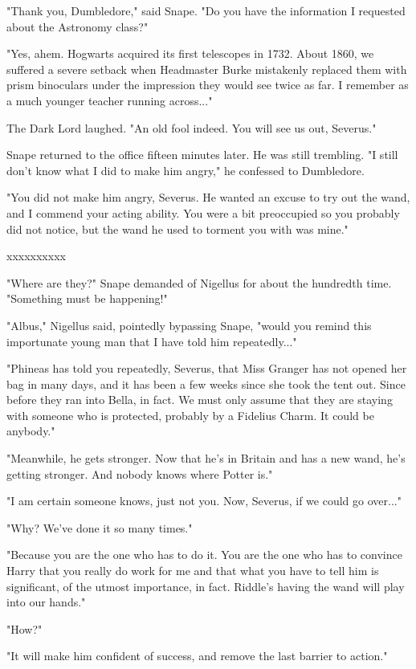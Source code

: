 \documentclass[a4paper,11pt]{article}
\begin{document}
"Thank you, Dumbledore," said Snape. "Do you have the information I requested about the Astronomy class?"

"Yes, ahem. Hogwarts acquired its first telescopes in 1732. About 1860, we suffered a severe setback when Headmaster Burke mistakenly replaced them with prism binoculars under the impression they would see twice as far. I remember as a much younger teacher running across..."

The Dark Lord laughed. "An old fool indeed. You will see us out, Severus."

Snape returned to the office fifteen minutes later. He was still trembling. "I still don't know what I did to make him angry," he confessed to Dumbledore.

"You did not make him angry, Severus. He wanted an excuse to try out the wand, and I commend your acting ability. You were a bit preoccupied so you probably did not notice, but the wand he used to torment you with was mine."

xxxxxxxxxx

"Where are they?" Snape demanded of Nigellus for about the hundredth time. "Something must be happening!"

"Albus," Nigellus said, pointedly bypassing Snape, "would you remind this importunate young man that I have told him repeatedly..."

"Phineas has told you repeatedly, Severus, that Miss Granger has not opened her bag in many days, and it has been a few weeks since she took the tent out. Since before they ran into Bella, in fact. We must only assume that they are staying with someone who is protected, probably by a Fidelius Charm. It could be anybody."

"Meanwhile, he gets stronger. Now that he's in Britain and has a new wand, he's getting stronger. And nobody knows where Potter is."

"I am certain someone knows, just not you. Now, Severus, if we could go over..."

"Why? We've done it so many times."

"Because you are the one who has to do it. You are the one who has to convince Harry that you really do work for me and that what you have to tell him is significant, of the utmost importance, in fact. Riddle's having the wand will play into our hands."

"How?"

"It will make him confident of success, and remove the last barrier to action."
\end{document}
